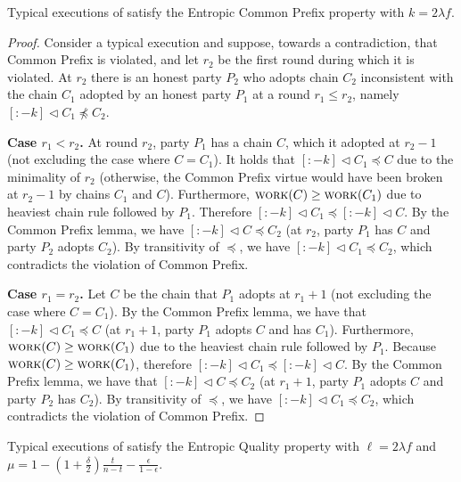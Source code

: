 \begin{theorem} \label{thm:common-prefix}
  Typical executions of \poem satisfy the Entropic Common Prefix property
  with $k = 2 \lambda f$.
\end{theorem}
\begin{proof}
  Consider a typical execution and suppose, towards a contradiction, that Common
  Prefix is violated, and let $r_2$ be the first round during which it is violated.
  At $r_2$ there is an honest party $P_2$ who adopts chain $C_2$
  inconsistent with the chain $C_1$ adopted by an honest party
  $P_1$ at a round $r_1 \leq r_2$, namely $[{:}{-k}] \lhd C_1 \not\preceq C_2$.

  \noindent
  \textbf{Case $r_1 < r_2$.}
  At round $r_2$, party $P_1$ has a chain $C$,
  which it adopted at $r_2 - 1$ (not excluding the case
  where $C = C_1$). It holds that $[{:}{-k}] \lhd C_1 \preceq C$
  due to the minimality of $r_2$ (otherwise, the Common Prefix virtue would
  have been broken at $r_2 - 1$ by chains $C_1$ and $C$).
  Furthermore, $\textsc{work}(C) \geq \textsc{work}(C_1)$ due to heaviest chain
  rule followed by $P_1$. Therefore $[{:}{-k}] \lhd C_1 \preceq [{:}{-k}] \lhd C$.
  By the Common Prefix lemma, we have $[{:}{-k}] \lhd C \preceq C_2$
  (at $r_2$, party $P_1$ has $C$ and party $P_2$ adopts $C_2$).
  By transitivity of $\preceq$, we have $[{:}{-k}] \lhd C_1 \preceq C_2$,
  which contradicts the violation of Common Prefix.

  \noindent
  \textbf{Case $r_1 = r_2$.}
  Let $C$ be the chain that $P_1$ adopts at $r_1 + 1$ (not excluding the case
  where $C = C_1$).
  By the Common Prefix lemma, we have that
  $[{:}{-k}] \lhd C_1 \preceq C$ (at $r_1 + 1$, party $P_1$ adopts $C$ and has $C_1$).
  Furthermore, $\textsc{work}(C) \geq \textsc{work}(C_1)$ due to the heaviest chain
  rule followed by $P_1$.
  Because $\textsc{work}(C) \geq \textsc{work}(C_1)$, therefore $[{:}{-k}] \lhd C_1 \preceq [{:}{-k}] \lhd C$.
  By the Common Prefix lemma, we have that
  $[{:}{-k}] \lhd C \preceq C_2$ (at $r_1 + 1$, party $P_1$ adopts $C$ and party $P_2$ has $C_2$).
  By transitivity of $\preceq$, we have $[{:}{-k}] \lhd C_1 \preceq C_2$,
  which contradicts the violation of Common Prefix.
  \Qed
\end{proof}

\begin{theorem} \label{thm:entoropic-quality} 
  Typical executions of \poem satisfy the Entropic Quality property
  with $\ell = 2 \lambda f$ and
  $\mu = 1 - (1 + \frac{\delta}{2})\frac{t}{n - t} - \frac{\epsilon}{1 - \epsilon}$.
\end{theorem}


